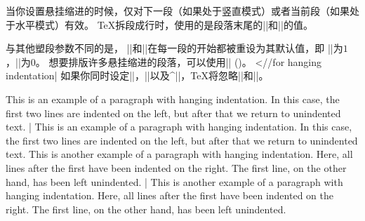 当你设置悬挂缩进的时候，仅对下一段（如果处于竖直模式）或者当前段（如果处于水平模式）有效。
\TeX{}拆段成行时，使用的是段落末尾的|\hangafter|和|\hangindent|的值。
%


与其他塑段参数不同的是，
|\hangafter|和|\hangindent|在每一段的开始都被重设为其默认值，即
|\hangafter|为$1$，|\hangindent|为$0$。
想要排版许多悬挂缩进的段落，可以使用|\everypar| (\xref{\everypar})。
^^|\everypar//for hanging indentation|
如果你同时设定|\hangafter|，|\hangindent|以及^|\parshape|，\TeX{}将忽略|\hangafter|和|\hangindent|。

\example
\hangindent=6pc 
This is an example of a paragraph with hanging indentation.
In this case, the first two lines are indented on the left,
but after that we return to unindented text.
|
\produces
\hangindent=6pc 
This is an example of a paragraph with hanging indentation.
In this case, the first two lines are indented on the left,
but after that we return to unindented text.
\nextexample
\hangindent=-6pc 
This is another example of a paragraph with hanging
indentation.  Here, all lines after the first have been
indented on the right. The first line, on the other
hand, has been left unindented.
|
\produces
\hangindent=-6pc 
This is another example of a paragraph with hanging
indentation.  Here, all lines after the first have been
indented on the right. The first line, on the other
hand, has been left unindented.
\endexample
\enddesc

